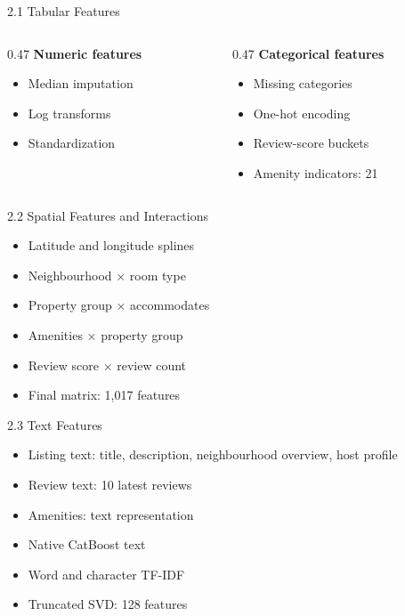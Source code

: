 \documentclass[aspectratio=169,11pt]{beamer}
\begin{document}
\begin{frame}{2.1 Tabular Features}
  \begin{columns}[T,onlytextwidth]
    \begin{column}{0.47\textwidth}
      \textbf{Numeric features}
      \begin{itemize}
        \item Median imputation
        \item Log transforms
        \item Standardization
      \end{itemize}
    \end{column}
    \begin{column}{0.47\textwidth}
      \textbf{Categorical features}
      \begin{itemize}
        \item Missing categories
        \item One-hot encoding
        \item Review-score buckets
        \item Amenity indicators: 21
      \end{itemize}
    \end{column}
  \end{columns}
\end{frame}

\begin{frame}{2.2 Spatial Features and Interactions}
  \begin{itemize}
    \item Latitude and longitude splines
    \item Neighbourhood $\times$ room type
    \item Property group $\times$ accommodates
    \item Amenities $\times$ property group
    \item Review score $\times$ review count
    \item Final matrix: 1,017 features
  \end{itemize}
\end{frame}

\begin{frame}{2.3 Text Features}
  \begin{itemize}
    \item Listing text: title, description, neighbourhood overview, host profile
    \item Review text: 10 latest reviews
    \item Amenities: text representation
    \item Native CatBoost text
    \item Word and character TF-IDF
    \item Truncated SVD: 128 features
  \end{itemize}
\end{frame}
\end{document}
